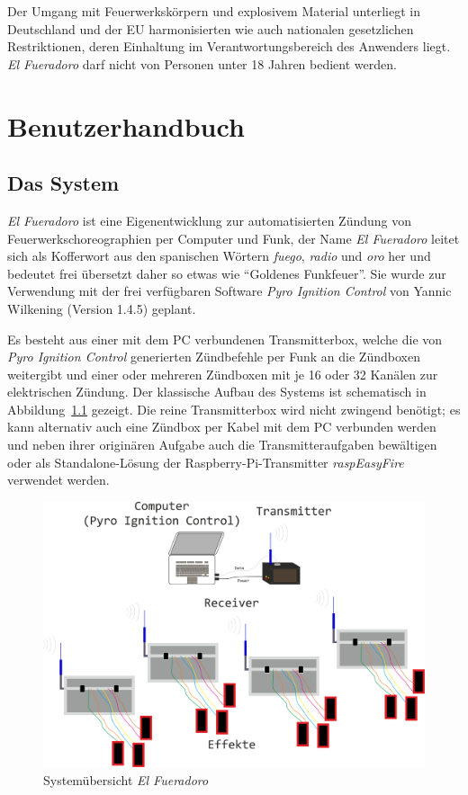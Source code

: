\documentclass[paper=a4, parskip, numbers=noenddot, toc=listof, headsepline]{scrbook}
\newcommand{\pic}{\emph{Pyro Ignition Control}}
\newcommand{\anlage}{\emph{El Fueradoro}}
\begin{document}
	Der Umgang mit Feuerwerkskörpern und explosivem Material unterliegt in Deutschland und der EU harmonisierten wie auch nationalen gesetzlichen Restriktionen, deren Einhaltung im Verantwortungsbereich des Anwenders liegt. {\anlage} darf nicht von Personen unter 18 Jahren bedient werden.

	\tableofcontents
\part{Benutzerhandbuch}

	\chapter{Das System}

		\anlage{} ist eine Eigenentwicklung zur automatisierten Zündung von Feuer\-werks\-choreo\-gra\-phien per Computer und Funk, der Name {\anlage} leitet sich als Kofferwort aus den spanischen Wörtern \emph{fuego}, \emph{radio} und \emph{oro} her und bedeutet frei übersetzt daher so etwas wie \enquote{Goldenes Funkfeuer}. Sie wurde zur Verwendung mit der frei verfügbaren Software {\pic} von Yannic Wilkening (Version 1.4.5) geplant.

		Es besteht aus einer mit dem PC verbundenen Transmitterbox, welche die von {\pic} generierten Zündbefehle per Funk an die Zündboxen weitergibt und einer oder mehreren Zündboxen mit je 16 oder 32 Kanälen zur elektrischen Zündung. Der klassische Aufbau des Systems ist schematisch in Abbildung~\ref{fig:system} gezeigt. Die reine Transmitterbox wird nicht zwingend benötigt; es kann alternativ auch eine Zündbox per Kabel mit dem PC verbunden werden und neben ihrer originären Aufgabe auch die Transmitteraufgaben bewältigen oder als Standalone-Lösung der Raspberry-Pi-Transmitter \emph{raspEasyFire} verwendet werden.

		\begin{figure}
			\centering
			\includegraphics[width=.8\textwidth]{Bilder/system}
			\caption{Systemübersicht \anlage}
			\label{fig:system}
		\end{figure}
\end{document}
